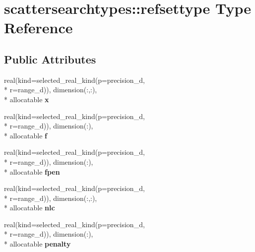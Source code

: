 \hypertarget{structscattersearchtypes_1_1refsettype}{\section{scattersearchtypes\-:\-:refsettype Type Reference}
\label{structscattersearchtypes_1_1refsettype}
}
\subsection*{Public Attributes}
\begin{DoxyCompactItemize}
\item 
\hypertarget{structscattersearchtypes_1_1refsettype_ad41305f9304fe8a6501299a00a8902f4}{real(kind=selected\-\_\-real\-\_\-kind(p=precision\-\_\-d, \\*
r=range\-\_\-d)), dimension(\-:,\-:), \\*
allocatable {\bfseries x}}\label{structscattersearchtypes_1_1refsettype_ad41305f9304fe8a6501299a00a8902f4}

\item 
\hypertarget{structscattersearchtypes_1_1refsettype_a6a746140659167e08fab4c147d9c72a9}{real(kind=selected\-\_\-real\-\_\-kind(p=precision\-\_\-d, \\*
r=range\-\_\-d)), dimension(\-:), \\*
allocatable {\bfseries f}}\label{structscattersearchtypes_1_1refsettype_a6a746140659167e08fab4c147d9c72a9}

\item 
\hypertarget{structscattersearchtypes_1_1refsettype_a4a3fa7fb17af6155aed6634d6703bd0d}{real(kind=selected\-\_\-real\-\_\-kind(p=precision\-\_\-d, \\*
r=range\-\_\-d)), dimension(\-:), \\*
allocatable {\bfseries fpen}}\label{structscattersearchtypes_1_1refsettype_a4a3fa7fb17af6155aed6634d6703bd0d}

\item 
\hypertarget{structscattersearchtypes_1_1refsettype_a83a5035aef5fdbbd7af580812ff3452e}{real(kind=selected\-\_\-real\-\_\-kind(p=precision\-\_\-d, \\*
r=range\-\_\-d)), dimension(\-:,\-:), \\*
allocatable {\bfseries nlc}}\label{structscattersearchtypes_1_1refsettype_a83a5035aef5fdbbd7af580812ff3452e}

\item 
\hypertarget{structscattersearchtypes_1_1refsettype_aa89d21d347d7bbeb8a42fae088eb4d13}{real(kind=selected\-\_\-real\-\_\-kind(p=precision\-\_\-d, \\*
r=range\-\_\-d)), dimension(\-:), \\*
allocatable {\bfseries penalty}}\label{structscattersearchtypes_1_1refsettype_aa89d21d347d7bbeb8a42fae088eb4d13}


\end{DoxyCompactItemize}

